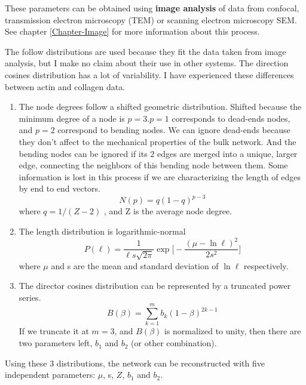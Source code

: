 These parameters can be obtained using \textbf{image analysis} of data from
\gls{confocal}, transmission electron microscopy (\gls{TEM}) or
scanning electron microscopy \gls{SEM}. See chapter \ref{Chapter-Image} for
more information about this process.

The follow distributions are used because they fit the data taken from image
analysis, but I make no claim about their use in other systems. The
direction cosines distribution has a lot of variability. I have experienced
these differences between actin and collagen data.
\begin{enumerate} 
\item The node degrees follow a shifted geometric distribution. Shifted because
the minimum degree of a node is $p=3$.$p=1$ corresponds to dead-ends nodes, and
$p=2$ correspond to bending nodes. We can ignore dead-ends because they don't
affect to the mechanical properties of the bulk network. And the bending nodes
can be ignored if its $2$ edges are merged into a unique, larger edge,
connecting the neighbors of this bending node between them. Some information is lost in this
process if we are characterizing the length of edges by end to end
vectors.
\begin{equation} \label{degree-dist}
N(p)=q(1-q)^{p-3} 
\end{equation}
where $q=1/(Z-2)$ , and Z is the average node degree.
\item The length distribution is logarithmic-normal  
\begin{equation} \label{length-dist}
P(\ell)=\frac{1}{\ell
s\sqrt{2\pi}}\exp{\bigg[-\frac{(\mu-\ln{\ell})^2}{2s^2}\bigg]}
\end{equation}
where $\mu$ and s are the mean and standard deviation of $\ln{\ell}$
respectively.
\item The director cosines distribution can be represented by a truncated power
series.
\begin{equation} \label{cosines-dist}
B(\beta)=\sum_{k=1}^{m} b_k(1-\beta)^{2k-1}
\end{equation}
If we truncate it at $m=3$, and $B(\beta)$ is normalized to unity, then there
are two parameters left, $b_1$ and $b_2$ (or other combination).
\end{enumerate}

Using these $3$ distributions, the network can be reconstructed with five
independent parameters: $\mu$, s, $Z$, $b_1$ and $b_2$.

